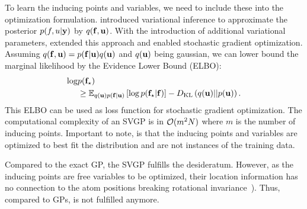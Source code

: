 To learn the inducing points and variables, we need to include these into the optimization formulation. \citet{titsias2009Variational} introduced variational inference to approximate the posterior $p(f, u \vert \mathbf{y})$ by $q(\mathbf{f}, \mathbf{u})$. With the introduction of additional variational parameters, \citet{hensman2013Gaussian} extended this approach and enabled stochastic gradient optimization. Assuming $q(\mathbf{f}, \mathbf{u}) = p(\mathbf{f} \vert \mathbf{u}) q(\mathbf{u})$ and $q(\mathbf{u})$ being gaussian, we can lower bound the marginal likelihood by the Evidence Lower Bound (ELBO):
\begin{equation}\begin{aligned}\label{eq:elbo}
	\log &p(\mathbf{f}_\star) \\ &\geq \operatorname{\mathbb{E}}_{q(\mathbf{u})p(\mathbf{f}\vert \mathbf{u})} \left[\log p(\mathbf{f}_\star \vert \mathbf{f})\right] - D_{\mathrm{KL}}\left(q(\mathbf{u}) \vert\vert p(\mathbf{u})\right).
\end{aligned}\end{equation}
This ELBO can be used as loss function for stochastic gradient optimization. The computational complexity of an SVGP is in $\mathcal{O}(m^2N)$ where $m$ is the number of inducing points. Important to note, is that the inducing points and variables are optimized to best fit the distribution and are not instances of the training data. 

Compared to the exact GP, the SVGP fulfills the \desseven{} desideratum. However, as the inducing points are free variables to be optimized, their location information has no connection to the atom positions breaking rotational invariance~\citep{vandermause2020On}).
Thus, compared to GPs, \desone{} is not fulfilled anymore. 
